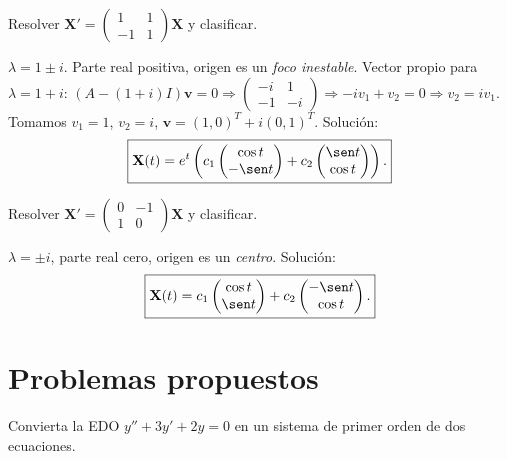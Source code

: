 \begin{prob}
Resolver $\mathbf{X}'=
\begin{pmatrix}
1&1\\
-1&1
\end{pmatrix}\mathbf{X}$
y clasificar.
\begin{myproof}
$\lambda=1\pm i$. Parte real positiva, origen es un \emph{foco inestable}. Vector propio para $\lambda=1+i$: $(A-(1+i)I)\mathbf{v}=0\Rightarrow
\begin{pmatrix}
-i&1\\
-1&-i
\end{pmatrix}\Rightarrow -i v_1+v_2=0\Rightarrow v_2=i v_1$. Tomamos $v_1=1$, $v_2=i$, $\mathbf{v}=(1,0)^T+i(0,1)^T$.
Solución:
\[
\boxed{
\mathbf{X}(t)=e^t\left(c_1
\begin{pmatrix}
\cos t\\-\sen t
\end{pmatrix}
+c_2
\begin{pmatrix}
\sen t\\\cos t
\end{pmatrix}\right).
}
\]
\end{myproof}
\end{prob}

\begin{prob}
Resolver $\mathbf{X}'=
\begin{pmatrix}
0&-1\\
1&0
\end{pmatrix}\mathbf{X}$
y clasificar.
\begin{myproof}
$\lambda=\pm i$, parte real cero, origen es un \emph{centro}. Solución:
\[
\boxed{
\mathbf{X}(t)=c_1
\begin{pmatrix}
\cos t\\\sen t
\end{pmatrix}
+c_2
\begin{pmatrix}
-\sen t\\\cos t
\end{pmatrix}.
}
\]
\end{myproof}
\end{prob}

\section{Problemas propuestos}

\begin{prob}
Convierta la EDO $y''+3y'+2y=0$ en un sistema de primer orden de dos ecuaciones.
\end{prob}

